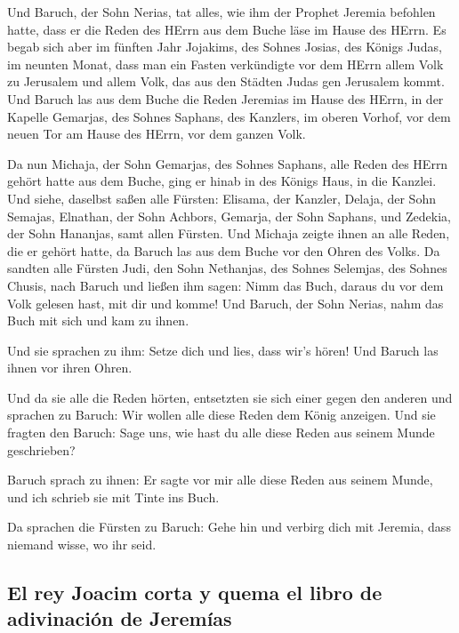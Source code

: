  Und Baruch, der Sohn Nerias, tat alles, wie ihm der
Prophet Jeremia befohlen hatte, dass er die Reden des HErrn aus dem
Buche läse im Hause des HErrn.  Es begab sich aber im
fünften Jahr Jojakims, des Sohnes Josias, des Königs Judas, im neunten
Monat, dass man ein Fasten verkündigte vor dem HErrn allem Volk zu
Jerusalem und allem Volk, das aus den Städten Judas gen Jerusalem kommt.
 Und Baruch las aus dem Buche die Reden Jeremias im Hause
des HErrn, in der Kapelle Gemarjas, des Sohnes Saphans, des Kanzlers, im
oberen Vorhof, vor dem neuen Tor am Hause des HErrn, vor dem ganzen
Volk.

 Da nun Michaja, der Sohn Gemarjas, des Sohnes Saphans,
alle Reden des HErrn gehört hatte aus dem Buche,  ging er
hinab in des Königs Haus, in die Kanzlei. Und siehe, daselbst saßen alle
Fürsten: Elisama, der Kanzler, Delaja, der Sohn Semajas, Elnathan, der
Sohn Achbors, Gemarja, der Sohn Saphans, und Zedekia, der Sohn Hananjas,
samt allen Fürsten.  Und Michaja zeigte ihnen an alle
Reden, die er gehört hatte, da Baruch las aus dem Buche vor den Ohren
des Volks.  Da sandten alle Fürsten Judi, den Sohn
Nethanjas, des Sohnes Selemjas, des Sohnes Chusis, nach Baruch und
ließen ihm sagen: Nimm das Buch, daraus du vor dem Volk gelesen hast,
mit dir und komme! Und Baruch, der Sohn Nerias, nahm das Buch mit sich
und kam zu ihnen.

 Und sie sprachen zu ihm: Setze dich und lies, dass wir's
hören! Und Baruch las ihnen vor ihren Ohren.

 Und da sie alle die Reden hörten, entsetzten sie sich
einer gegen den anderen und sprachen zu Baruch: Wir wollen alle diese
Reden dem König anzeigen.  Und sie fragten den Baruch:
Sage uns, wie hast du alle diese Reden aus seinem Munde geschrieben?

 Baruch sprach zu ihnen: Er sagte vor mir alle diese
Reden aus seinem Munde, und ich schrieb sie mit Tinte ins Buch.

 Da sprachen die Fürsten zu Baruch: Gehe hin und verbirg
dich mit Jeremia, dass niemand wisse, wo ihr seid.

\hypertarget{el-rey-joacim-corta-y-quema-el-libro-de-adivinaciuxf3n-de-jeremuxedas}{%
\subsection{El rey Joacim corta y quema el libro de adivinación de
Jeremías}\label{el-rey-joacim-corta-y-quema-el-libro-de-adivinaciuxf3n-de-jeremuxedas}}

